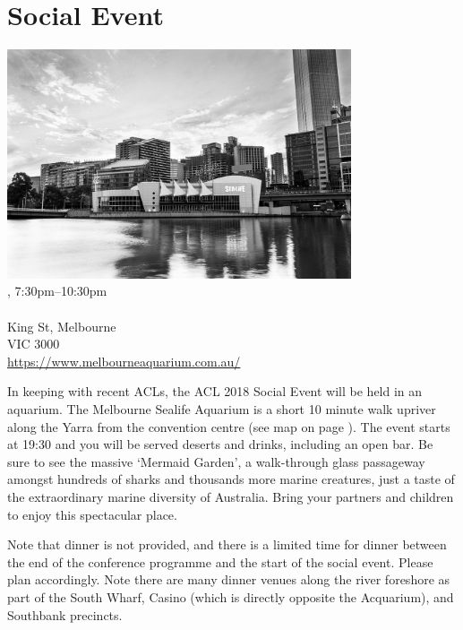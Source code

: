\clearpage
\section[Social Event: \daydate, 7:30pm]{Social Event}
\setheaders{}{\daydateyear}

\begin{center}

\includegraphics[width=4in]{content/day2/aquarium.jpg} \\


\daydateyear, 7:30pm--10:30pm \vspace{1em}\\
\SocialLoc\\
King St, Melbourne \\
VIC 3000 \\
\url{https://www.melbourneaquarium.com.au/}
\end{center}

In keeping with recent ACLs, the ACL 2018 Social Event will be held in
an aquarium.  The Melbourne Sealife Aquarium is a short 10 minute walk upriver
along the Yarra from the convention centre (see map on page
\pageref{page:surrounds-map}). 
The event starts at 19:30 and you will be served deserts and drinks, including
an open bar.  Be sure to see the massive `Mermaid Garden', a walk-through glass
passageway amongst hundreds of sharks and thousands more marine
creatures, just a taste of the extraordinary marine diversity of
Australia. Bring your partners and children to enjoy this spectacular
place.

Note that dinner is not provided, and there is a limited time for dinner
between the end of the conference programme and the start of the social
event.  Please plan accordingly.  Note there are many dinner venues
along the river foreshore as part of the South Wharf, Casino (which is
directly opposite the Acquarium), and Southbank precincts.
